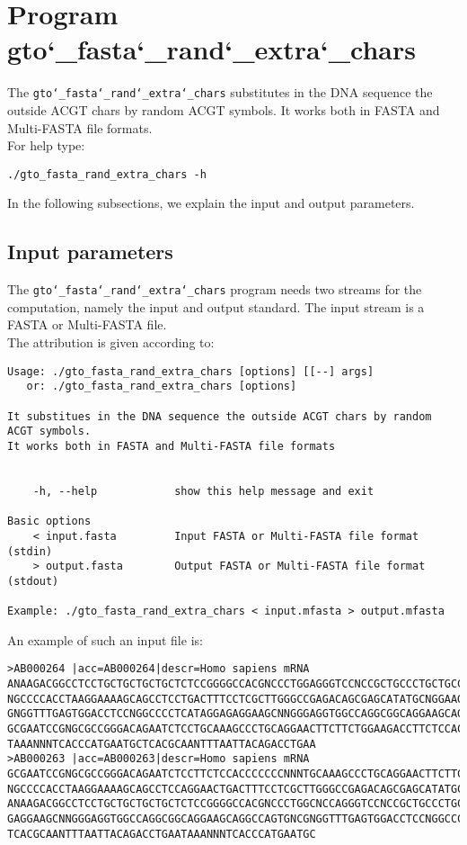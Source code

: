 \section{Program gto\char`_fasta\char`_rand\char`_extra\char`_chars}
The \texttt{gto\char`_fasta\char`_rand\char`_extra\char`_chars} substitutes in the DNA sequence the outside ACGT chars by random ACGT symbols. It works both in FASTA and Multi-FASTA file formats.\\
For help type:
\begin{lstlisting}
./gto_fasta_rand_extra_chars -h
\end{lstlisting}
In the following subsections, we explain the input and output parameters.

\subsection*{Input parameters}

The \texttt{gto\char`_fasta\char`_rand\char`_extra\char`_chars} program needs two streams for the computation, namely the input and output standard. The input stream is a FASTA or Multi-FASTA file.\\
The attribution is given according to:
\begin{lstlisting}
Usage: ./gto_fasta_rand_extra_chars [options] [[--] args]
   or: ./gto_fasta_rand_extra_chars [options]

It substitues in the DNA sequence the outside ACGT chars by random ACGT symbols.
It works both in FASTA and Multi-FASTA file formats


    -h, --help            show this help message and exit

Basic options
    < input.fasta         Input FASTA or Multi-FASTA file format (stdin)
    > output.fasta        Output FASTA or Multi-FASTA file format (stdout)

Example: ./gto_fasta_rand_extra_chars < input.mfasta > output.mfasta
\end{lstlisting}
An example of such an input file is:
\begin{lstlisting}
>AB000264 |acc=AB000264|descr=Homo sapiens mRNA 
ANAAGACGGCCTCCTGCTGCTGCTGCTCTCCGGGGCCACGNCCCTGGAGGGTCCNCCGCTGCCCTGCTGCCATTGNCNCC
NGCCCCACCTAAGGAAAAGCAGCCTCCTGACTTTCCTCGCTTGGGCCGAGACAGCGAGCATATGCNGGAAGCGGCAGGAA
GNGGTTTGAGTGGACCTCCNGGCCCCTCATAGGAGAGGAAGCNNGGGAGGTGGCCAGGCGGCAGGAAGCAGGCCAGTGNC
GCGAATCCGNGCGCCGGGACAGAATCTCCTGCAAAGCCCTGCAGGAACTTCTTCTGGAAGACCTTCTCCACCCCCCCNNN
TAAANNNTCACCCATGAATGCTCACGCAANTTTAATTACAGACCTGAA
>AB000263 |acc=AB000263|descr=Homo sapiens mRNA 
GCGAATCCGNGCGCCGGGACAGAATCTCCTTCTCCACCCCCCCNNNTGCAAAGCCCTGCAGGAACTTCTTCTGGAAGACC
NGCCCCACCTAAGGAAAAGCAGCCTCCAGGAACTGACTTTCCTCGCTTGGGCCGAGACAGCGAGCATATGCNGGAAGCGG
ANAAGACGGCCTCCTGCTGCTGCTGCTCTCCGGGGCCACGNCCCTGGCNCCAGGGTCCNCCGCTGCCCTGCTGCCATTGN
GAGGAAGCNNGGGAGGTGGCCAGGCGGCAGGAAGCAGGCCAGTGNCGNGGTTTGAGTGGACCTCCNGGCCCCTCATAGGA
TCACGCAANTTTAATTACAGACCTGAATAAANNNTCACCCATGAATGC
\end{lstlisting}

